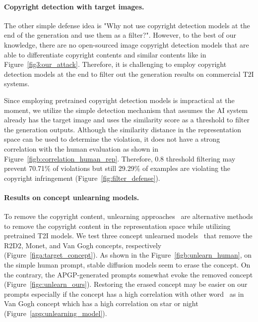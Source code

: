 \vspace{-0.1in}
\paragraph{Copyright detection with target images.} The other simple defense idea is "Why not use copyright detection models at the end of the generation and use them as a filter?". However, to the best of our knowledge, there are no open-sourced image copyright detection models that are able to differentiate copyright contents and similar contents like in Figure~\ref{fig3:our_attack}. Therefore, it is challenging to employ copyright detection models at the end to filter out the generation results on commercial T2I systems.

Since employing pretrained copyright detection models is impractical at the moment, we utilize the simple detection mechanism that assumes the AI system already has the target image and uses the similarity score as a threshold to filter the generation outputs. Although the similarity distance in the representation space can be used to determine the violation, it does not have a strong correlation with the human evaluation as shown in Figure~\ref{figb:correlation_human_rep}. Therefore, 0.8 threshold filtering may prevent 70.71\% of violations but still 29.29\% of examples are violating the copyright infringement (Figure~\ref{fig:filter_defense}). 

\vspace{-0.1in}
\paragraph{Results on concept unlearning models.} To remove the copyright content, unlearning approaches~\citep{kumari2023ablating, gandikota2023erasing} are alternative methods to remove the copyright content in the representation space while utilizing pretrained T2I models. We test three concept unlearned models~\citep{kumari2023ablating} that remove the R2D2, Monet, and Van Gogh concepts, respectively (Figure~\ref{figa:target_concept}). As shown in the Figure~\ref{figb:unlearn_human}, on the simple human prompt, stable diffusion models seem to erase the concept. On the contrary, the APGP-generated prompts somewhat evoke the removed concept (Figure~\ref{figc:unlearn_ours}). Restoring the erased concept may be easier on our prompts especially if the concept has a high correlation with other word~\citep{kumari2023ablating} as in Van Gogh concept which has a high correlation on star or night (Figure~\ref{app:unlearning_model}).

